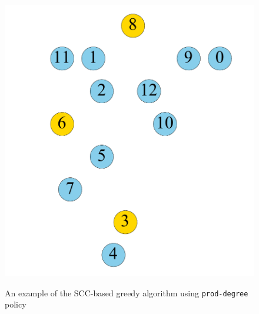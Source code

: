 \begin{figure}[t]
\begin{minipage}[b]{0.19\linewidth}
                        {\includegraphics[width=\textwidth]{./alg_fig/scc-g7}}
   		\end{minipage}  
  	\vspace{-1em}             
   \caption{An example of the SCC-based greedy algorithm using \texttt{prod-degree} policy}
   \vspace{-1em}
   \label{fig:scc}
\end{figure}


